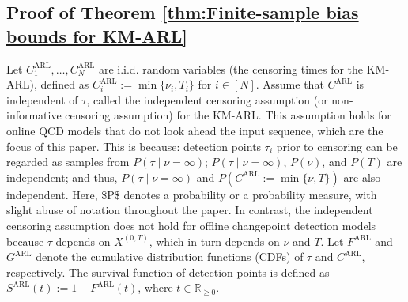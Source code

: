 \documentclass{article}
\theoremstyle{plain}
\theoremstyle{definition}
\theoremstyle{remark}
\def\mbr{\mathbb{R}}
\begin{document}
\subsection{Proof of Theorem \ref{thm:Finite-sample bias bounds for KM-ARL}} \label{app:Proof of B_FS for KM-ARL}
Let $C_1^\mathrm{ARL}, \ldots, C_N^\mathrm{ARL}$ are i.i.d. random variables (the censoring times for the KM-ARL), defined as $C_i^\mathrm{ARL} := \min\{\nu_i, T_i \}$ for $i \in [N]$.
Assume that $C^\mathrm{ARL}$ is independent of $\tau$, called the independent censoring assumption (or non-informative censoring assumption) for the KM-ARL.
This assumption holds for online QCD models that do not look ahead the input sequence, which are the focus of this paper.
This is because: detection points $\tau_i$ prior to censoring can be regarded as samples from $P(\tau \mid \nu=\infty)$;  $P(\tau \mid \nu=\infty)$, $P(\nu)$, and $P(T)$ are independent; and thus, $P(\tau \mid \nu=\infty)$ and $P(C^\mathrm{ARL}:= \min\{\nu, T\})$ are also independent. Here, \$P\$ denotes a probability or a probability measure, with slight abuse of notation throughout the paper. 
In contrast, the independent censoring assumption does not hold for offline changepoint detection models because $\tau$ depends on $X^{(0, T)}$, which in turn depends on $\nu$ and $T$.
Let $F^\mathrm{ARL}$ and $G^\mathrm{ARL}$ denote the cumulative distribution functions (CDFs) of $\tau$ and $C^\mathrm{ARL}$, respectively.
The survival function of detection points is defined as $S^\mathrm{ARL}(t) := 1 - F^\mathrm{ARL}(t)$, where $t \in \mbr_{\geq 0}$.
\end{document}
